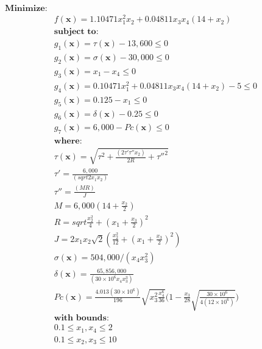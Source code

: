 \begin{equation*}
\begin{aligned}
\textbf{Minimize:} & \\
& f(\bm{x}) = 1.10471x_1^2x_2 + 0.04811x_3x_4(14 + x_2) \\[0.5em]
& \textbf{subject to:} \\
& g_1(\bm{x}) = \tau(\bm{x}) - 13,600 \leq 0 \\
& g_2(\bm{x}) = \sigma(\bm{x}) - 30,000 \leq 0 \\
& g_3(\bm{x}) = x_1 - x_4 \leq 0 \\
& g_4(\bm{x}) = 0.10471x_1^2 + 0.04811x_3x_4(14+x_2) - 5  \leq 0 \\
& g_5(\bm{x}) = 0.125 - x_1 \leq 0 \\
& g_6(\bm{x}) = \delta(\bm{x}) - 0.25 \leq 0 \\
& g_7(\bm{x}) = 6,000 - Pc(\bm{x}) \leq 0 \\[0.5em]
& \textbf{where:} \\
& \tau(\bm{x}) = \sqrt{\tau^2 + \frac{(2 \tau' \tau'' x_2)}{2R} + \tau''^2 } \\
& \tau' = \frac{6,000}{(sqrt{2} x_1 x_2)} \\[0.5em]
& \tau'' = \frac{(M R)}{J} \\
& M = 6,000 (14 + \frac{x_2}{2}) \\
& R = sqrt{\frac{x_2^2}{4} + (x_1 + \frac{x_3}{2})^2} \\
& J = 2 x_1 x_2 \sqrt{2} (\frac{x_2^2}{12} + (x_1 + \frac{x_3}{2})^2) \\[0.5em]
& \sigma(\bm{x}) = 504,000 / (x_4 x_3^2) \\
& \delta(\bm{x}) = \frac{65,856,000}{(30 \times 10^6 x_4 x_3^3)} \\
& Pc(\bm{x}) = \frac{4.013(30 \times 10^6)}{196} \sqrt{x_3^2 \frac{x_4^6}{36}} \Bigg(1 - \frac{x_3}{28} \sqrt{\frac{30 \times 10^6}{4(12 \times 10^6)}}\Bigg) \\[0.5em]
& \textbf{with bounds:} \\
&  0.1 \leq x_1, x_4 \leq 2 \\
&  0.1 \leq x_2, x_3 \leq 10
\end{aligned}
\end{equation*}
